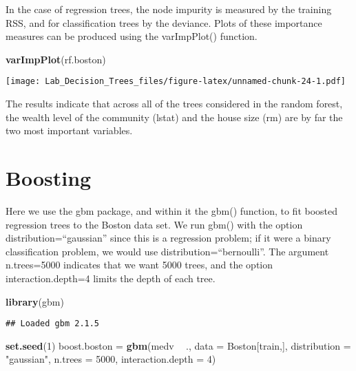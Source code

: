 \documentclass[]{article}
\newenvironment{Shaded}{\begin{snugshade}}{\end{snugshade}}
\newcommand{\KeywordTok}[1]{\textcolor[rgb]{0.13,0.29,0.53}{\textbf{#1}}}
\newcommand{\DataTypeTok}[1]{\textcolor[rgb]{0.13,0.29,0.53}{#1}}
\newcommand{\DecValTok}[1]{\textcolor[rgb]{0.00,0.00,0.81}{#1}}
\newcommand{\StringTok}[1]{\textcolor[rgb]{0.31,0.60,0.02}{#1}}
\newcommand{\OperatorTok}[1]{\textcolor[rgb]{0.81,0.36,0.00}{\textbf{#1}}}
\newcommand{\NormalTok}[1]{#1}
\begin{document}
In the case of regression trees, the node impurity is measured by the
training RSS, and for classification trees by the deviance. Plots of
these importance measures can be produced using the varImpPlot()
function.

\begin{Shaded}
\begin{Highlighting}[]
\KeywordTok{varImpPlot}\NormalTok{(rf.boston)}
\end{Highlighting}
\end{Shaded}

\texttt{[image: Lab\_Decision\_Trees\_files/figure-latex/unnamed-chunk-24-1.pdf]}

The results indicate that across all of the trees considered in the
random forest, the wealth level of the community (lstat) and the house
size (rm) are by far the two most important variables.

\section{Boosting}\label{boosting}

Here we use the gbm package, and within it the gbm() function, to fit
boosted regression trees to the Boston data set. We run gbm() with the
option distribution=``gaussian'' since this is a regression problem; if
it were a binary classification problem, we would use
distribution=``bernoulli''. The argument n.trees=5000 indicates that we
want 5000 trees, and the option interaction.depth=4 limits the depth of
each tree.

\begin{Shaded}
\begin{Highlighting}[]
\KeywordTok{library}\NormalTok{(gbm)}
\end{Highlighting}
\end{Shaded}

\begin{verbatim}
## Loaded gbm 2.1.5
\end{verbatim}

\begin{Shaded}
\begin{Highlighting}[]
\KeywordTok{set.seed}\NormalTok{(}\DecValTok{1}\NormalTok{)}
\NormalTok{boost.boston =}\StringTok{ }\KeywordTok{gbm}\NormalTok{(medv }\OperatorTok{~}\StringTok{ }\NormalTok{., }\DataTypeTok{data =}\NormalTok{ Boston[train,],}
                 \DataTypeTok{distribution =} \StringTok{"gaussian"}\NormalTok{,}
                 \DataTypeTok{n.trees =} \DecValTok{5000}\NormalTok{, }
                 \DataTypeTok{interaction.depth =} \DecValTok{4}\NormalTok{)}
\end{Highlighting}
\end{Shaded}
\end{document}
